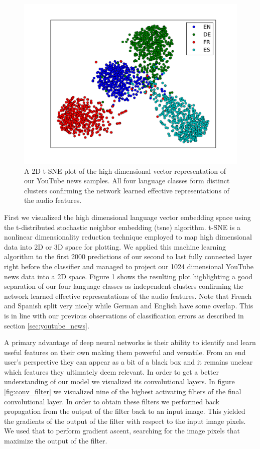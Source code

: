	\begin{figure}[h]
  		\centering
    	\includegraphics[width=\textwidth, keepaspectratio]{plots/tsne.pdf}
    	\caption{A 2D t-SNE plot of the high dimensional vector representation of our YouTube news samples. All four language classes form distinct clusters confirming the network learned effective representations of the audio features.}
    	\label{fig:tsne}
	\end{figure}

First we visualized the high dimensional language vector embedding space using the  t-distributed stochastic neighbor embedding (\ac{tsne}) algorithm\cite{maaten2008visualizing}. t-SNE is a nonlinear dimensionality reduction technique employed to map high dimensional data into 2D or 3D space for plotting. We applied this machine learning algorithm to the first 2000 predictions of our second to last fully connected layer right before the classifier and managed to project our 1024 dimensional YouTube news data into a 2D space. Figure \ref{fig:tsne} shows the resulting plot highlighting a good separation of our four language classes as independent clusters confirming the network learned effective representations of the audio features. Note that French and Spanish split very nicely while German and English have some overlap. This is in line with our previous observations of classification errors as described in section \ref{sec:youtube_news}.

A primary advantage of deep neural networks is their ability to identify and learn useful features on their own making them powerful and versatile. From an end user's perspective they can appear as a bit of a black box and it remains unclear which features they ultimately deem relevant. In order to get a better understanding of our model we visualized its convolutional layers. In figure \ref{fig:conv_filter} we visualized nine of the highest activating filters of the final convolutional layer. In order to obtain these filters we performed back propagation from the output of the filter back to an input image. This yielded the gradients of the output of the filter with respect to the input image pixels. We used that to perform gradient ascent, searching for the image pixels that maximize the output of the filter.

